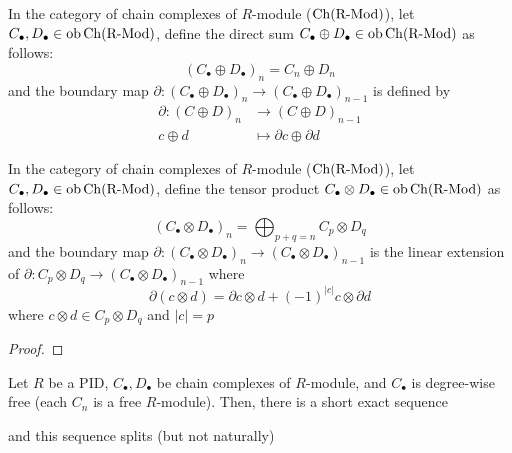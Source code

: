 \documentclass{article}
\begin{document}
\begin{definition}
    In the category of chain complexes of $R$-module ($\operatorname{Ch}(\operatorname{R-Mod})$), let $C_\bullet, D_\bullet \in \operatorname{ob} \operatorname{Ch}(\operatorname{R-Mod})$, define the direct sum $C_\bullet \oplus D_\bullet \in \operatorname{ob} \operatorname{Ch}(\operatorname{R-Mod})$ as follows:
    $$
        (C_\bullet \oplus D_\bullet)_n = C_n \oplus D_n
    $$
    and the boundary map $\partial: (C_\bullet \oplus D_\bullet)_n \to (C_\bullet \oplus D_\bullet)_{n-1}$ is defined by
    \begin{align*}
        \partial:   (C \oplus D)_n &\to (C \oplus D)_{n-1} \\
                    c \oplus d &\mapsto \partial c \oplus \partial d
    \end{align*}
    
\end{definition}

\begin{definition}
    In the category of chain complexes of $R$-module ($\operatorname{Ch}(\operatorname{R-Mod})$), let $C_\bullet, D_\bullet \in \operatorname{ob} \operatorname{Ch}(\operatorname{R-Mod})$, define the tensor product $C_\bullet \otimes D_\bullet \in \operatorname{ob} \operatorname{Ch}(\operatorname{R-Mod})$ as follows:
    $$
        (C_\bullet \otimes D_\bullet)_n = \bigoplus_{p + q = n} C_p \otimes D_q
    $$
    and the boundary map $\partial: (C_\bullet \otimes D_\bullet)_n \to (C_\bullet \otimes D_\bullet)_{n-1}$ is the linear extension of $\partial: C_p \otimes D_q \to (C_\bullet \otimes D_\bullet)_{n-1}$ where
    $$
        \partial (c \otimes d) = \partial c \otimes d + (-1)^{|c|} c \otimes \partial d
    $$
    where $c \otimes d \in C_p \otimes D_q$ and $|c| = p$
\end{definition}

\begin{proof}
\end{proof}

\begin{definition}
\end{definition}

\begin{theorem}
    Let $R$ be a PID, $C_\bullet, D_\bullet$ be chain complexes of $R$-module, and $C_\bullet$ is degree-wise free (each $C_n$ is a free $R$-module). Then, there is a short exact sequence
    \begin{center}
    \end{center}
    and this sequence splits (but not naturally)
\end{theorem}
\end{document}
